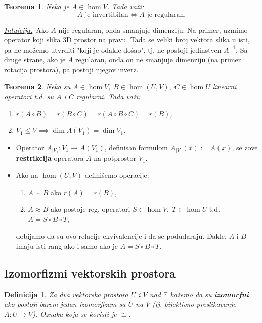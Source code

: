 \documentclass[a4paper,12pt,twoside]{report}
\newtheorem{theorem}{Teorema}[section]
\newtheorem{definition}{Definicija}[section]
\numberwithin{algorithm}{section}
\newcommand{\intuicija}{\noindent\underline{\textit{Intuicija:}}\ }
\begin{document}
\begin{theorem}
    Neka je $A \in \hom V$. Tada važi:
    \[ A \text{ je invertibilan} \iff A\text{ je regularan}. \]
\end{theorem}
\intuicija Ako $A$ nije regularan, onda smanjuje dimenziju. Na primer, uzmimo operator koji slika 3D prostor na pravu. Tada 
se veliki broj vektora slika u isti, pa ne možemo utvrditi "koji je odakle došao", tj. ne postoji jedinstven $A^{-1}$. Sa druge 
strane, ako je $A$ regularan, onda on ne smanjuje dimenziju (na primer rotacija prostora), pa postoji njegov inverz.

\begin{theorem}
    Neka su $A \in \hom V, \; B \in \hom (U, V), \; C \in \hom U$ linearni operatori t.d. su $A$ i $C$ regularni. Tada važi:
    \begin{enumerate}
        \item $r(A \circ B) = r(B \circ C) = r(A \circ B \circ C) = r(B)$,
        \item $V_1 \leq V \implies \dim A(V_1) = \dim V_1$.
    \end{enumerate}
\end{theorem}

\begin{itemize}
    \item Operator $A_{|V_1}:V_1 \to A(V_1)$, definisan formulom $A_{|V_1}(x) := A(x)$, se zove \textbf{restrikcija} operatora $A$
    na potprostor $V_1$.
    \item Ako na $\hom (U, V)$ definišemo operacije:
    \begin{enumerate}
        \item $A \sim B$ ako $r(A) = r(B)$,
        \item $A \approx B$ ako postoje reg. operatori $S \in \hom V, \; T \in \hom U$ t.d. $A = S\circ B \circ T$,
    \end{enumerate}
    dobijamo da su ovo relacije ekvivalencije i da se podudaraju. Dakle, $A$ i $B$ imaju isti rang ako i samo ako je $A = S\circ B \circ T$.
\end{itemize}

\subsection{Izomorfizmi vektorskih prostora}
\label{izomorfizmi}

\begin{definition}
    Za dva vektorska prostora $U$ i $V$ nad $\mathbb{F}$ kažemo da su \textbf{izomorfni} ako postoji barem jedan izomorfizam sa 
    $U$ na $V$ (tj. bijektivno preslikavanje $A: U \to V$). Oznaka koja se koristi je $\cong$.
\end{definition}
\end{document}
